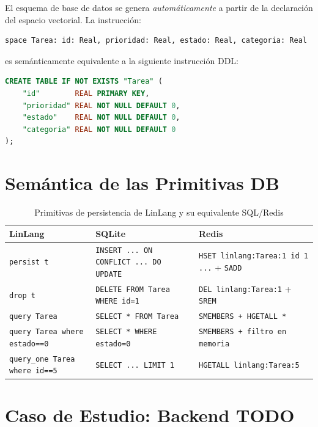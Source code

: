 \documentclass[12pt, a4paper, openany]{report}
\theoremstyle{definition}
\begin{document}
El esquema de base de datos se genera \emph{automáticamente} a partir de la declaración del espacio vectorial. La instrucción:

\begin{lstlisting}
space Tarea: id: Real, prioridad: Real, estado: Real, categoria: Real
\end{lstlisting}

es semánticamente equivalente a la siguiente instrucción DDL:

\begin{lstlisting}[language=SQL, caption={DDL generado automáticamente por LinLang}]
CREATE TABLE IF NOT EXISTS "Tarea" (
    "id"        REAL PRIMARY KEY,
    "prioridad" REAL NOT NULL DEFAULT 0,
    "estado"    REAL NOT NULL DEFAULT 0,
    "categoria" REAL NOT NULL DEFAULT 0
);
\end{lstlisting}

\section{Semántica de las Primitivas DB}

\begin{table}[H]
\centering
\caption{Primitivas de persistencia de LinLang y su equivalente SQL/Redis}
\begin{tabularx}{\linewidth}{@{}L{3.8cm}L{4.2cm}L{4.4cm}@{}}
\toprule
\textbf{LinLang} & \textbf{SQLite} & \textbf{Redis} \\
\midrule
\texttt{persist t} & \texttt{INSERT ... ON CONFLICT ... DO UPDATE} & \texttt{HSET linlang:Tarea:1 id 1 ...} + \texttt{SADD} \\
\texttt{drop t} & \texttt{DELETE FROM Tarea WHERE id=1} & \texttt{DEL linlang:Tarea:1} + \texttt{SREM} \\
\texttt{query Tarea} & \texttt{SELECT * FROM Tarea} & \texttt{SMEMBERS + HGETALL *} \\
\texttt{query Tarea where estado==0} & \texttt{SELECT * WHERE estado=0} & \texttt{SMEMBERS + filtro en memoria} \\
\texttt{query\_one Tarea where id==5} & \texttt{SELECT ... LIMIT 1} & \texttt{HGETALL linlang:Tarea:5} \\
\bottomrule
\end{tabularx}
\end{table}

\section{Caso de Estudio: Backend TODO}
\end{document}
